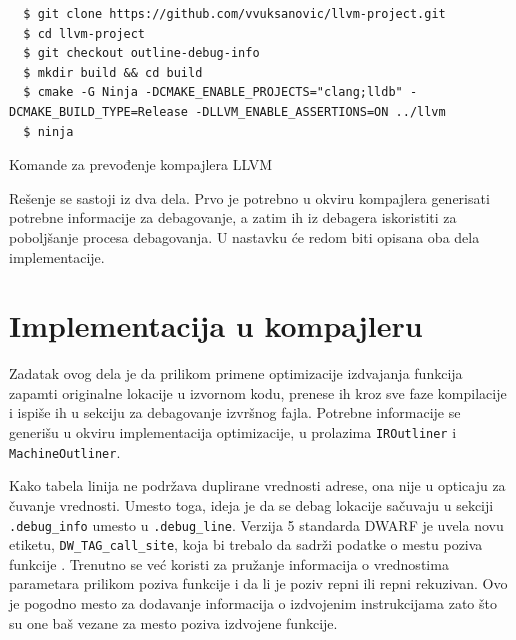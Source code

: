 \documentclass[12pt,oneside]{memoir}
\begin{document}
\begin{listing}[!ht]
\begin{verbatim}
  $ git clone https://github.com/vvuksanovic/llvm-project.git
  $ cd llvm-project
  $ git checkout outline-debug-info
  $ mkdir build && cd build
  $ cmake -G Ninja -DCMAKE_ENABLE_PROJECTS="clang;lldb" -DCMAKE_BUILD_TYPE=Release -DLLVM_ENABLE_ASSERTIONS=ON ../llvm
  $ ninja
\end{verbatim}
\caption{Komande za prevođenje kompajlera LLVM}
\label{lst:llvm_compile_commands}
\end{listing}

Rešenje se sastoji iz dva dela.
Prvo je potrebno u okviru kompajlera generisati potrebne informacije za debagovanje, a zatim ih iz debagera iskoristiti za poboljšanje procesa debagovanja.
U nastavku će redom biti opisana oba dela implementacije.

\section{Implementacija u kompajleru}


Zadatak ovog dela je da prilikom primene optimizacije izdvajanja funkcija zapamti originalne lokacije u izvornom kodu, prenese ih kroz sve faze kompilacije i ispiše ih u sekciju za debagovanje izvršnog fajla.
Potrebne informacije se generišu u okviru implementacija optimizacije, u prolazima \verb|IROutliner| i \verb|MachineOutliner|.

Kako tabela linija ne podržava duplirane vrednosti adrese, ona nije u opticaju za čuvanje vrednosti.
Umesto toga, ideja je da se debag lokacije sačuvaju u sekciji \verb|.debug_info| umesto u \verb|.debug_line|.
Verzija 5 standarda DWARF je uvela novu etiketu, \verb|DW_TAG_call_site|, koja bi trebalo da sadrži podatke o mestu poziva funkcije \cite{jelinek2010callsite}.
Trenutno se već koristi za pružanje informacija o vrednostima parametara prilikom poziva funkcije \cite{jelinek2010entryvalue} i da li je poziv repni ili repni rekuzivan. %
Ovo je pogodno mesto za dodavanje informacija o izdvojenim instrukcijama zato što su one baš vezane za mesto poziva izdvojene funkcije.
\end{document}
